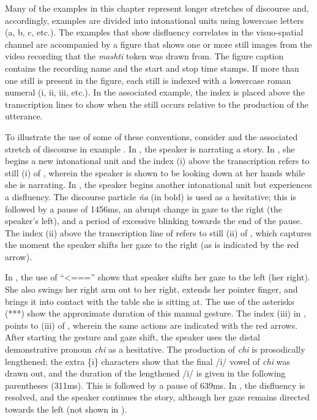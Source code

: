 \documentclass[output=paper]{langscibook}
\begin{document}
Many of the examples in this chapter represent longer stretches of discourse and, accordingly, examples are divided into intonational units using lowercase letters (a, b, c, etc.). The examples that show disfluency correlates in the visuo-spatial channel are accompanied by a figure that shows one or more still images from the video recording that the \textit{mashti} token was drawn from. The figure caption contains the recording name and the start and stop time stamps. If more than one still is present in the figure, each still is indexed with a lowercase roman numeral (i, ii, iii, etc.). In the associated example, the index is placed above the transcription lines to show when the still occurs relative to the production of the utterance. 

To illustrate the use of some of these conventions, consider  and the associated stretch of discourse in example . In , the speaker is narrating a story. In , she begins a new intonational unit and the index (i) above the transcription refers to still (i) of , wherein the speaker is shown to be looking down at her hands while she is narrating. In , the speaker begins another intonational unit but experiences a disfluency. The discourse particle \textit{ña} (in bold) is used as a hesitative; this is followed by a pause of 1456ms, an abrupt change in gaze to the right (the speaker’s left), and a period of excessive blinking towards the end of the pause. The index (ii) above the transcription line of  refers to still (ii) of , which captures the moment the speaker shifts her gaze to the right (as is indicated by the red arrow).

In , the use of “<===” shows that speaker shifts her gaze to the left (her right). She also swings her right arm out to her right, extends her pointer finger, and brings it into contact with the table she is sitting at. The use of the asterisks (***) show the approximate duration of this manual gesture. The index (iii) in , points to (iii) of , wherein the same actions are indicated with the red arrows. After starting the gesture and gaze shift, the speaker uses the distal demonstrative pronoun \textit{chi} as a hesitative. The production of \textit{chi} is prosodically lengthened; the extra \{i\} characters show that the final /i/ vowel of \textit{chi} was drawn out, and the duration of the lengthened /i/ is given in the following parentheses (311ms). This is followed by a pause of 639ms. In , the disfluency is resolved, and the speaker continues the story, although her gaze remains directed towards the left (not shown in ).
\end{document}
